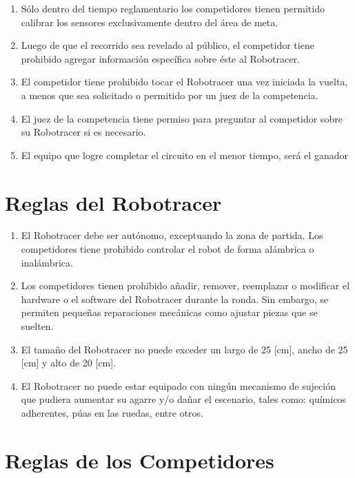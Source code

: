 \begin{enumerate}
  \item Sólo dentro del tiempo reglamentario los competidores tienen permitido calibrar los sensores exclusivamente dentro del área de meta.

  \item Luego de que el recorrido sea revelado al público, el competidor tiene prohibido agregar información específica sobre éste al Robotracer.

  \item El competidor tiene prohibido tocar el Robotracer una vez iniciada la vuelta, a menos que sea solicitado o permitido por un juez de la competencia.

  \item El juez de la competencia tiene permiso para preguntar al competidor sobre su Robotracer si es necesario.

  \item El equipo que logre completar el circuito en el menor tiempo, será el ganador
\end{enumerate}


\section{Reglas del Robotracer}

\begin{enumerate}
  \item El Robotracer debe ser autónomo, exceptuando la zona de partida. Los competidores tiene prohibido controlar el robot de forma alámbrica o inalámbrica.

  \item Los competidores tienen prohibido añadir, remover, reemplazar o modificar el hardware o el software del Robotracer durante la ronda. Sin embargo, se permiten pequeñas reparaciones mecánicas como ajustar piezas que se suelten.

  \item El tamaño del Robotracer no puede exceder un largo de 25 [cm], ancho de 25 [cm] y alto de 20 [cm].

  \item El Robotracer no puede estar equipado con ningún mecanismo de sujeción que pudiera aumentar su agarre y/o dañar el escenario, tales como: químicos adherentes, púas en las ruedas, entre otros.
\end{enumerate}

\section{Reglas de los Competidores}

